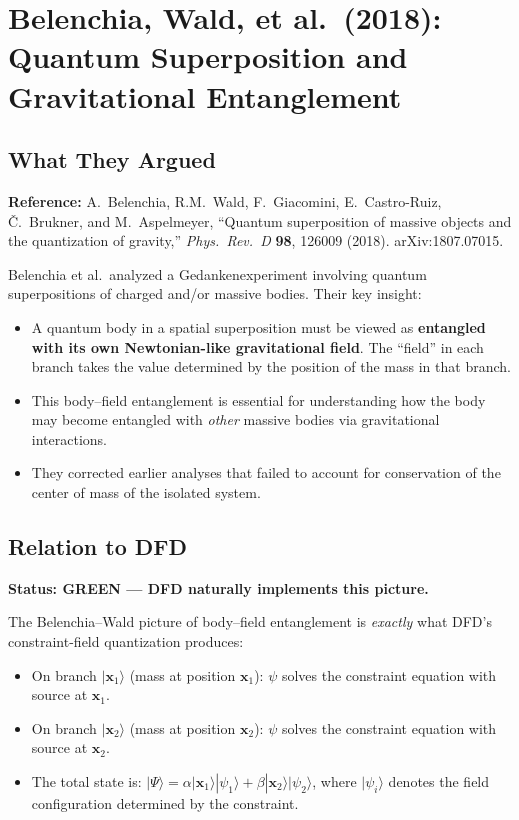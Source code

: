 \documentclass[12pt,a4paper]{article}
\newcommand{\GREEN}{\textcolor{dfdgreen}{\textbf{GREEN}}}
\begin{document}
\section{Belenchia, Wald, et al.\ (2018): Quantum Superposition and Gravitational Entanglement}
\label{sec:belenchia-wald}

\subsection{What They Argued}

\textbf{Reference:} A.\ Belenchia, R.M.\ Wald, F.\ Giacomini, E.\ Castro-Ruiz, \v{C}.\ Brukner, and M.\ Aspelmeyer, ``Quantum superposition of massive objects and the quantization of gravity,'' \textit{Phys.\ Rev.\ D} \textbf{98}, 126009 (2018). arXiv:1807.07015.

Belenchia et al.\ analyzed a Gedankenexperiment involving quantum superpositions of charged and/or massive bodies. Their key insight:

\begin{itemize}
\item A quantum body in a spatial superposition must be viewed as \textbf{entangled with its own Newtonian-like gravitational field}. The ``field'' in each branch takes the value determined by the position of the mass in that branch.
\item This body--field entanglement is essential for understanding how the body may become entangled with \emph{other} massive bodies via gravitational interactions.
\item They corrected earlier analyses that failed to account for conservation of the center of mass of the isolated system.
\end{itemize}

\subsection{Relation to DFD}

\textbf{Status: \GREEN{} --- DFD naturally implements this picture.}

The Belenchia--Wald picture of body--field entanglement is \emph{exactly} what DFD's constraint-field quantization produces:

\begin{itemize}
\item On branch $|\mathbf{x}_1\rangle$ (mass at position $\mathbf{x}_1$): $\psi$ solves the constraint equation with source at $\mathbf{x}_1$.
\item On branch $|\mathbf{x}_2\rangle$ (mass at position $\mathbf{x}_2$): $\psi$ solves the constraint equation with source at $\mathbf{x}_2$.
\item The total state is: $|\Psi\rangle = \alpha|\mathbf{x}_1\rangle|\psi_1\rangle + \beta|\mathbf{x}_2\rangle|\psi_2\rangle$, where $|\psi_i\rangle$ denotes the field configuration determined by the constraint.
\end{itemize}
\end{document}
